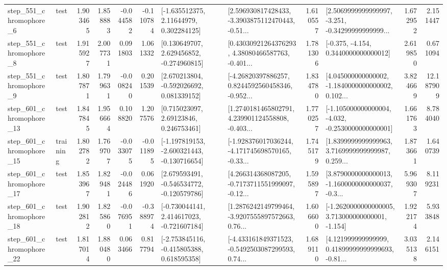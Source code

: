 \begin{tabular}{llrrrrllrlrr}
   step\_551\_chromophore\_6 &      test &      1.903465 &    1.858883 &     -0.044582 & -0.110784 &     [-1.635512375, 2.11644979, 0.302284125] &  [2.596930817428433, -3.3903875112470443, -0.51... &       1.610557 &  [2.5069999999999997, -3.251, -0.34299999999999... &            1.672952 &          2.151447 \\
   step\_551\_chromophore\_8 &      test &      1.915927 &    2.007731 &      0.091803 &  1.061332 &    [0.130649707, 2.629456852, -0.274960815] &  [0.43030921264376293, 4.38080466587763, -0.401... &       1.781306 &               [-0.375, -4.154, 0.3440000000000012] &            2.619850 &          0.671094 \\
   step\_551\_chromophore\_9 &      test &      1.807871 &    1.799631 &     -0.008240 &  0.201539 &    [2.670213804, -0.592026692, 0.081339152] &  [-4.26820397886257, 0.8244592560458346, -0.952... &       1.834780 &  [4.045000000000002, -1.1840000000000002, 0.102... &            3.824669 &         12.187909 \\
  step\_601\_chromophore\_13 &      test &      1.847845 &    1.956664 &      0.108820 &  1.207576 &      [0.715023097, 2.69123846, 0.246753461] &  [1.2740181465802791, 4.239901124558808, -0.403... &       1.770257 &  [-1.105000000000004, -4.032, -0.2530000000000001] &            1.661763 &          8.784040 \\
  step\_601\_chromophore\_15 &  training &      1.802782 &    1.769707 &     -0.033075 & -0.011895 &  [-1.197819153, -2.600321443, -0.130716654] &  [-1.928376017036244, -4.171745698570165, -0.33... &       1.745179 &  [1.8399999999999963, 3.7169999999999987, 0.259... &            1.873661 &          1.640739 \\
  step\_601\_chromophore\_17 &      test &      1.853967 &    1.829481 &     -0.024486 &  0.061920 &   [2.679593491, -0.546534772, -0.120579786] &  [4.266314368087205, -0.7173711551999097, -0.12... &       1.595897 &  [3.8790000000000013, -1.1600000000000037, -0.3... &            5.969307 &          8.119231 \\
  step\_601\_chromophore\_18 &      test &      1.902812 &    1.825860 &     -0.076951 & -0.388974 &   [-0.730044141, 2.414617023, -0.721607184] &  [1.2876242149799464, -3.9207555897572663, 0.76... &       1.606600 &   [-1.2620000000000005, 3.713000000000001, -1.154] &            1.922174 &          5.933848 \\
  step\_601\_chromophore\_22 &      test &      1.817014 &    1.880480 &      0.063466 &  0.817794 &   [-2.753845116, -0.415805388, 0.618595358] &  [-4.433161849371523, -0.5492503087299593, 0.74... &       1.689110 &  [4.121999999999999, 0.41899999999999693, -0.81... &            3.035138 &          2.146151 \\

\end{tabular}
